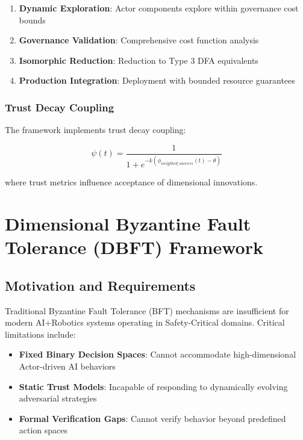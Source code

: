 \documentclass[12pt,a4paper]{article}
\begin{document}
\begin{enumerate}
    \item \textbf{Dynamic Exploration}: Actor components explore within governance cost bounds
    \item \textbf{Governance Validation}: Comprehensive cost function analysis
    \item \textbf{Isomorphic Reduction}: Reduction to Type 3 DFA equivalents
    \item \textbf{Production Integration}: Deployment with bounded resource guarantees
\end{enumerate}

\subsubsection{Trust Decay Coupling}

The framework implements trust decay coupling:

\begin{equation}
\psi(t) = \frac{1}{1 + e^{-k(\phi_{weighted\_success}(t) - \theta)}}
\end{equation}

where trust metrics influence acceptance of dimensional innovations.

\clearpage

\section{Dimensional Byzantine Fault Tolerance (DBFT) Framework}

\subsection{Motivation and Requirements}

Traditional Byzantine Fault Tolerance (BFT) mechanisms are insufficient for modern AI+Robotics systems operating in Safety-Critical domains. Critical limitations include:

\begin{itemize}
    \item \textbf{Fixed Binary Decision Spaces}: Cannot accommodate high-dimensional Actor-driven AI behaviors
    \item \textbf{Static Trust Models}: Incapable of responding to dynamically evolving adversarial strategies
    \item \textbf{Formal Verification Gaps}: Cannot verify behavior beyond predefined action spaces
\end{itemize}
\end{document}
